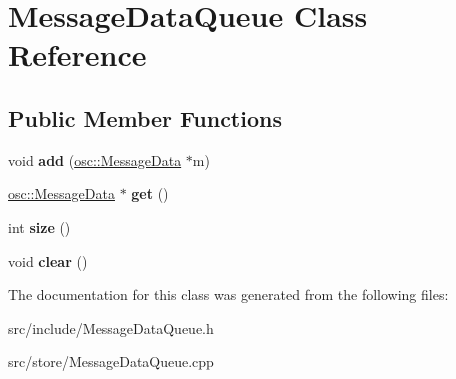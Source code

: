 \hypertarget{classMessageDataQueue}{\section{Message\-Data\-Queue Class Reference}
\label{classMessageDataQueue}
}
\subsection*{Public Member Functions}
\begin{DoxyCompactItemize}
\item 
\hypertarget{classMessageDataQueue_a8d2d0c5e6b879c240a5845b2c789c130}{void {\bfseries add} (\hyperlink{classosc_1_1MessageData}{osc\-::\-Message\-Data} $\ast$m)}\label{classMessageDataQueue_a8d2d0c5e6b879c240a5845b2c789c130}

\item 
\hypertarget{classMessageDataQueue_ae1829552864a18207ca556edcb82a76d}{\hyperlink{classosc_1_1MessageData}{osc\-::\-Message\-Data} $\ast$ {\bfseries get} ()}\label{classMessageDataQueue_ae1829552864a18207ca556edcb82a76d}

\item 
\hypertarget{classMessageDataQueue_a6f7619c03371e76b95a2c2d348da866d}{int {\bfseries size} ()}\label{classMessageDataQueue_a6f7619c03371e76b95a2c2d348da866d}

\item 
\hypertarget{classMessageDataQueue_a565232895a0e0cc0416715aedf2e5e21}{void {\bfseries clear} ()}\label{classMessageDataQueue_a565232895a0e0cc0416715aedf2e5e21}

\end{DoxyCompactItemize}


The documentation for this class was generated from the following files\-:\begin{DoxyCompactItemize}
\item 
src/include/Message\-Data\-Queue.\-h\item 
src/store/Message\-Data\-Queue.\-cpp\end{DoxyCompactItemize}
